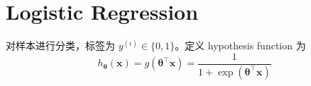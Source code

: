 \section{Logistic Regression}
	对样本进行分类，标签为 $ y^{(i)} \in \{0, 1\} $。定义 hypothesis function 为
	\begin{equation}
		h_{\bm\theta}(\bm{x}) = g(\bm{\theta}^\intercal \bm{x}) = \frac{1}{1 + \exp{({\bm{\theta}}^\intercal \bm{x})}}
	\end{equation}
	